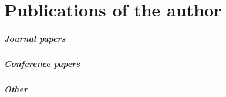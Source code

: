 \chapter{Publications of the author}\label{chapPublications}

\paragraph{Journal papers}
\begin{refsection}
	\nocite{StranskyMicromachines2011}
	\nocite{SongHuangShuStranskyWuSubmitted}
	\newrefcontext[sorting=ynt]
	\printbibliography[heading=none]
\end{refsection}

\paragraph{Conference papers}
\begin{refsection}
	\nocite{StranskyNMM2010}
	\nocite{StranskyNMM2011}
	\nocite{StranskyNMM2012}
	\nocite{StranskyNMM2013}
	\nocite{StranskyNMM2014}
	\nocite{StranskyNMM2015}
	\nocite{StranskyEngMech2011}
	\nocite{StranskyEngMech2012}
	\nocite{StranskyEngMech2013}
	\nocite{StranskyEngMech2014}
	\nocite{StranskyEngMech2015}
	\nocite{StranskyJuniorstav2012}
	\nocite{StranskyJuniorstav2014}
	\nocite{StranskyParticles2011}
	\nocite{StranskyParticles2013}
	\nocite{StranskyModelingAndSimulation2010}
	\newrefcontext[sorting=ynt]
	\printbibliography[heading=none]
\end{refsection}

\paragraph{Other}
\begin{refsection}
	\nocite{yade2010}
	\nocite{yade2015}
	\nocite{edubeamManual2015}
	\newrefcontext[sorting=ynt]
	\printbibliography[heading=none]
\end{refsection}
